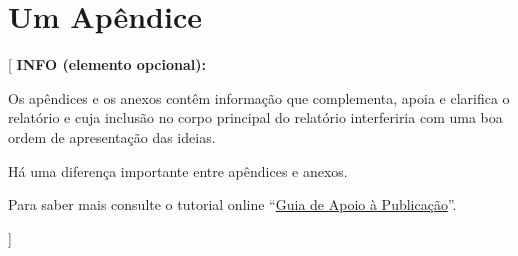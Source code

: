 \documentclass[11pt,a4paper]{report}
\newenvironment{infoopt}[1]{\vspace*{6mm}\color{blue}
                            [ \textbf{INFO (elemento opcional):} \begin{em} #1}
                        {\vspace*{3mm}\end{em} ]}
\begin{document}

\appendix
\chapter{Um Apêndice}

\begin{infoopt}
Os apêndices e os anexos contêm informação que complementa, apoia e
clarifica o relatório e cuja inclusão no corpo principal do relatório
interferiria com uma boa ordem de apresentação das ideias.

Há uma diferença importante entre apêndices e anexos.

Para saber mais consulte o tutorial online 
``\href{https://docs.google.com/document/d/1TDC1behVq8x7fQL4CcPEEh_np5GXviJevQxnQ9gbiJs/edit}
{Guia de Apoio à Publicação}''.
\end{infoopt}

\end{document}
